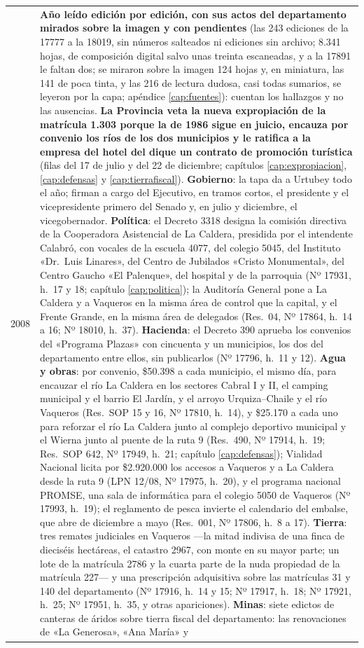 \begin{longtable}{@{}p{2.7cm}p{10.3cm}@{}}
2008 & \textbf{Año leído edición por edición, con sus actos del departamento mirados sobre la imagen y con pendientes} (las 243 ediciones de la 17777 a la 18019, sin números salteados ni ediciones sin archivo; 8.341 hojas, de composición digital salvo unas treinta escaneadas, y a la 17891 le faltan dos; se miraron sobre la imagen 124 hojas y, en miniatura, las 141 de poca tinta, y las 216 de lectura dudosa, casi todas sumarios, se leyeron por la capa; apéndice \ref{cap:fuentes}): cuentan los hallazgos y no las ausencias. \textbf{La Provincia veta la nueva expropiación de la matrícula 1.303 porque la de 1986 sigue en juicio, encauza por convenio los ríos de los dos municipios y le ratifica a la empresa del hotel del dique un contrato de promoción turística} (filas del 17 de julio y del 22 de diciembre; capítulos \ref{cap:expropiacion}, \ref{cap:defensas} y \ref{cap:tierrafiscal}). \textbf{Gobierno}: la tapa da a Urtubey todo el año; firman a cargo del Ejecutivo, en tramos cortos, el presidente y el vicepresidente primero del Senado y, en julio y diciembre, el vicegobernador. \textbf{Política}: el Decreto 3318 designa la comisión directiva de la Cooperadora Asistencial de La Caldera, presidida por el intendente Calabró, con vocales de la escuela 4077, del colegio 5045, del Instituto «Dr.\ Luis Linares», del Centro de Jubilados «Cristo Monumental», del Centro Gaucho «El Palenque», del hospital y de la parroquia (Nº 17931, h.\ 17 y 18; capítulo \ref{cap:politica}); la Auditoría General pone a La Caldera y a Vaqueros en la misma área de control que la capital, y el Frente Grande, en la misma área de delegados (Res.\ 04, Nº 17864, h.\ 14 a 16; Nº 18010, h.\ 37). \textbf{Hacienda}: el Decreto 390 aprueba los convenios del «Programa Plazas» con cincuenta y un municipios, los dos del departamento entre ellos, sin publicarlos (Nº 17796, h.\ 11 y 12). \textbf{Agua y obras}: por convenio, \$50.398 a cada municipio, el mismo día, para encauzar el río La Caldera en los sectores Cabral I y II, el camping municipal y el barrio El Jardín, y el arroyo Urquiza--Chaile y el río Vaqueros (Res.\ SOP 15 y 16, Nº 17810, h.\ 14), y \$25.170 a cada uno para reforzar el río La Caldera junto al complejo deportivo municipal y el Wierna junto al puente de la ruta 9 (Res.\ 490, Nº 17914, h.\ 19; Res.\ SOP 642, Nº 17949, h.\ 21; capítulo \ref{cap:defensas}); Vialidad Nacional licita por \$2.920.000 los accesos a Vaqueros y a La Caldera desde la ruta 9 (LPN 12/08, Nº 17975, h.\ 20), y el programa nacional PROMSE, una sala de informática para el colegio 5050 de Vaqueros (Nº 17993, h.\ 19); el reglamento de pesca invierte el calendario del embalse, que abre de diciembre a mayo (Res.\ 001, Nº 17806, h.\ 8 a 17). \textbf{Tierra}: tres remates judiciales en Vaqueros ---la mitad indivisa de una finca de dieciséis hectáreas, el catastro 2967, con monte en su mayor parte; un lote de la matrícula 2786 y la cuarta parte de la nuda propiedad de la matrícula 227--- y una prescripción adquisitiva sobre las matrículas 31 y 140 del departamento (Nº 17916, h.\ 14 y 15; Nº 17917, h.\ 18; Nº 17921, h.\ 25; Nº 17951, h.\ 35, y otras apariciones). \textbf{Minas}: siete edictos de canteras de áridos sobre tierra fiscal del departamento: las renovaciones de «La Generosa», «Ana María» y 
\end{longtable}
